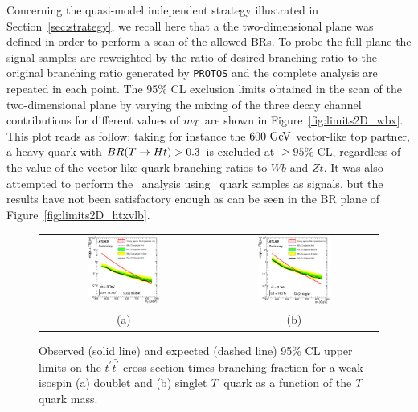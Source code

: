 Concerning the quasi-model independent strategy illustrated in Section~\ref{sec:strategy}, 
we recall here that a the two-dimensional plane was defined in order
to perform a scan of the allowed BRs.
To probe the full plane the signal samples are reweighted by the ratio
of desired branching ratio to the original branching ratio generated
by \texttt{PROTOS} and the complete analysis are repeated in each point.
The  95\% CL exclusion limits  obtained in the scan of the two-dimensional
plane by varying the mixing of the three decay channel contributions for
different values of $m_{\T}$ are shown in Figure~\ref{fig:limits2D_wbx}. 
This plot reads as follow: taking for instance the $600\gev$ 
vector-like top partner, a heavy quark with
$BR(\T\to Ht)>0.3$ is excluded at $\geq 95\%$ CL,
regardless of the value of the vector-like quark branching ratios to $Wb$ and $Zt$.  
It was also attempted to perform the \htx\ analysis
using \B\ quark samples as signals, but the results
have not been satisfactory enough as can be seen in the
BR plane of Figure~\ref{fig:limits2D_htxvlb}.


\begin{figure}[htbp]
\begin{center}
\begin{tabular}{cc}
\includegraphics[width=0.45\textwidth]{results/figures/htx/lim_doublet.eps} &
\includegraphics[width=0.45\textwidth]{results/figures/htx/lim_singlet.eps} \\
(a) & (b) \\
\end{tabular}
\caption{Observed (solid line) and expected (dashed line) 95\% CL upper limits on the $t^\prime \bar{t^\prime}$ cross section times branching fraction
for a weak-isospin (a) doublet and (b) singlet $\T$ quark  as a function of the $\T$ quark mass. 
\label{fig:limits1D_htx}}
\end{center}
\end{figure}

